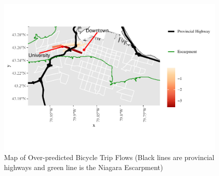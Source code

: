 \documentclass[smallextended]{svjour3}       %
\begin{document}
\begin{figure}
\centering
\includegraphics{BE-correlates-cycling-flows_files/figure-latex/residuals-over-1.pdf}
\caption{\label{fig:residuals-overestimated} Map of Over-predicted
Bicycle Trip Flows (Black lines are provincial highways and green line
is the Niagara Escarpment)}
\end{figure}
\end{document}
